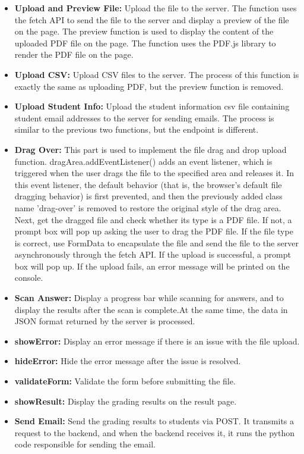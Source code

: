 \documentclass[twocolumn]{article}
\begin{document}
        \begin{itemize}
            \item \textbf{Upload and Preview File:} Upload the file to the server. The function uses the fetch API to send the file to the server and display a preview of the file on the page. The preview function is used to display the content of the uploaded PDF file on the page. The function uses the PDF.js library to render the PDF file on the page.
            \item \textbf{Upload CSV:} Upload CSV files to the server. The process of this function is exactly the same as uploading PDF, but the preview function is removed.
            \item \textbf{Upload Student Info:} Upload the student information csv file containing student email addresses to the server for sending emails. The process is similar to the previous two functions, but the endpoint is different.
            \item \textbf{Drag Over:} This part is used to implement the file drag and drop upload function. dragArea.addEventListener() adds an event listener, which is triggered when the user drags the file to the specified area and releases it. In this event listener, the default behavior (that is, the browser's default file dragging behavior) is first prevented, and then the previously added class name 'drag-over' is removed to restore the original style of the drag area. Next, get the dragged file and check whether its type is a PDF file. If not, a prompt box will pop up asking the user to drag the PDF file. If the file type is correct, use FormData to encapsulate the file and send the file to the server asynchronously through the fetch API. If the upload is successful, a prompt box will pop up. If the upload fails, an error message will be printed on the console.
            \item \textbf{Scan Answer:} Display a progress bar while scanning for answers, and to display the results after the scan is complete.At the same time, the data in JSON format returned by the server is processed.
            \item \textbf{showError:} Display an error message if there is an issue with the file upload.
            \item \textbf{hideError:} Hide the error message after the issue is resolved.
            \item \textbf{validateForm:} Validate the form before submitting the file.
            \item \textbf{showResult:} Display the grading results on the result page.
            \item \textbf{Send Email:} Send the grading results to students via POST. It transmits a request to the backend, and when the backend receives it, it runs the python code responsible for sending the email.
        \end{itemize}
\end{document}
